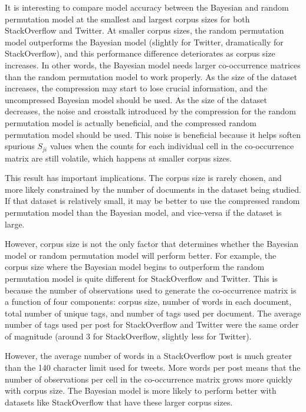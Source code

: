 \documentclass[man,floatsintext,donotrepeattitle]{apa6}
\begin{document}
It is interesting to compare model accuracy between the Bayesian and random permutation model at the smallest and largest corpus sizes for both StackOverflow and Twitter.
At smaller corpus sizes, the random permutation model outperforms the Bayesian model (slightly for Twitter, dramatically for StackOverflow), and this performance difference deteriorates as corpus size increases.
In other words, the Bayesian model needs larger co-occurrence matrices than the random permutation model to work properly.
As the size of the dataset increases, the compression may start to lose crucial information, and the uncompressed Bayesian model should be used.
As the size of the dataset decreases, the noise and crosstalk introduced by the compression for the random permutation model is actually beneficial, and the compressed random permutation model should be used. 
This noise is beneficial because it helps soften spurious $S_{ji}$ values when the counts for each individual cell in the co-occurrence matrix are still volatile, which happens at smaller corpus sizes.

This result has important implications.
The corpus size is rarely chosen, and more likely constrained by the number of documents in the dataset being studied.
If that dataset is relatively small, it may be better to use the compressed random permutation model than the Bayesian model, and vice-versa if the dataset is large.

However, corpus size is not the only factor that determines whether the Bayesian model or random permutation model will perform better.
For example, the corpus size where the Bayesian model begins to outperform the random permutation model is quite different for StackOverflow and Twitter.
This is because the number of observations used to generate the co-occurrence matrix is a function of four components:
corpus size, number of words in each document, total number of unique tags, and number of tags used per document.
The average number of tags used per post for StackOverflow and Twitter were the same order of magnitude (around 3 for StackOverflow, slightly less for Twitter).

However, the average number of words in a StackOverflow post is much greater than the 140 character limit used for tweets.
More words per post means that the number of observations per cell in the co-occurrence matrix grows more quickly with corpus size.
The Bayesian model is more likely to perform better with datasets like StackOverflow that have these larger corpus sizes.
\end{document}
